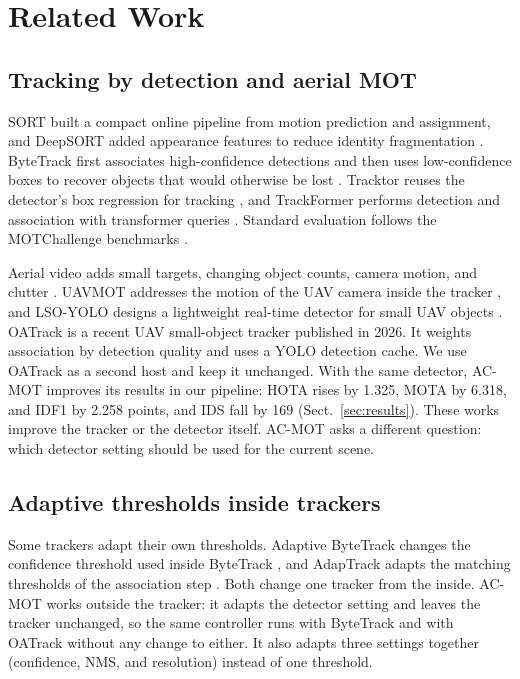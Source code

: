 \section{Related Work}\label{sec:related}

\subsection{Tracking by detection and aerial MOT}
SORT built a compact online pipeline from motion prediction and assignment,
and DeepSORT added appearance features to reduce identity fragmentation
\cite{bewley2016sort,wojke2017deepsort}. ByteTrack first associates
high-confidence detections and then uses low-confidence boxes to recover
objects that would otherwise be lost \cite{zhang2022bytetrack}. Tracktor
reuses the detector's box regression for tracking \cite{bergmann2019tracktor},
and TrackFormer performs detection and association with transformer queries
\cite{meinhardt2022trackformer}. Standard evaluation follows the MOTChallenge
benchmarks \cite{milan2020motchallenge}.

Aerial video adds small targets, changing object counts, camera motion, and
clutter \cite{zhu2022visdrone,du2018uavdt}. UAVMOT addresses the motion of the
UAV camera inside the tracker \cite{liu2022uavmot}, and LSO-YOLO designs a
lightweight real-time detector for small UAV objects \cite{dai2026lsoyolo}.
OATrack \cite{qi2026oatrack} is a recent UAV small-object tracker published in
2026. It weights association by detection quality and uses a YOLO detection
cache. We use OATrack as a second host and keep it unchanged. With the same
detector, AC-MOT improves its results in our pipeline: HOTA rises by 1.325,
MOTA by 6.318, and IDF1 by 2.258 points, and IDS fall by 169
(Sect.~\ref{sec:results}). These works improve the tracker or the detector
itself. AC-MOT asks a different question: which detector setting should be
used for the current scene.

\subsection{Adaptive thresholds inside trackers}
Some trackers adapt their own thresholds. Adaptive ByteTrack changes the
confidence threshold used inside ByteTrack \cite{ma2023adaptivebytetrack}, and
AdapTrack adapts the matching thresholds of the association step
\cite{shim2024adaptrack}. Both change one tracker from the inside. AC-MOT
works outside the tracker: it adapts the detector setting and leaves the
tracker unchanged, so the same controller runs with ByteTrack and with OATrack
without any change to either. It also adapts three settings together
(confidence, NMS, and resolution) instead of one threshold.

